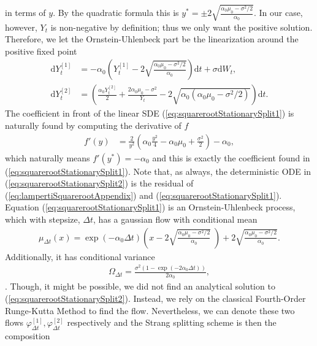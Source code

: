 in terms of $y$. By the quadratic formula this is $y^* = \pm 2\sqrt{\frac{\alpha_0\mu_0 - \sigma^2 / 2}{\alpha_0}}$. In our case, however, $Y_t$ is non-negative by definition; thus we only want the positive solution. Therefore, we let the Ornstein-Uhlenbeck part be the linearization around the positive fixed point
\begin{align}
    \mathrm{d}Y_t^{[1]} &= -\alpha_0 \left(Y_t^{[1]} - 2\sqrt{\frac{\alpha_0\mu_0 - \sigma^2 / 2}{\alpha_0}}\right)\mathrm{d}t + \sigma \mathrm{d}W_t , \label{eq:squarerootStationarySplit1} \\
    \mathrm{d}Y_t^{[2]} &= \left(\frac{\alpha_0 Y_t^{[2]}}{2} + \frac{2\alpha_0 \mu_0 - \sigma^2}{Y_t} - 2\sqrt{\alpha_0\left(\alpha_0\mu_0 - \sigma^2 / 2\right)}\right)\mathrm{d}t. \label{eq:squarerootStationarySplit2}
\end{align}
The coefficient in front of the linear SDE (\ref{eq:squarerootStationarySplit1}) is naturally found by computing the derivative of $f$
\begin{align}
    f'(y) &= \frac{2}{y^2}\left(\alpha_0\frac{y^2}{4}-\alpha_0\mu_0+\frac{\sigma^2}{2}\right) - \alpha_0,
\end{align}
which naturally means $f'(y^*) = - \alpha_0$ and this is exactly the coefficient found in (\ref{eq:squarerootStationarySplit1}). Note that, as always, the deterministic ODE in (\ref{eq:squarerootStationarySplit2}) is the residual of (\ref{eq:lampertiSquarerootAppendix}) and (\ref{eq:squarerootStationarySplit1}).
Equation (\ref{eq:squarerootStationarySplit1}) is an Ornstein-Uhlenbeck process, which with stepsize, $\Delta t$, has a gaussian flow with conditional mean 
\begin{align}
    \mu_{\Delta t}(x) = \exp\left(-\alpha_0 \Delta t\right) \left(x - 2\sqrt{\frac{\alpha_0\mu_0 - \sigma^2 / 2}{\alpha_0}}\;\right) + 2\sqrt{\frac{\alpha_0\mu_0 - \sigma^2 / 2}{\alpha_0}}.
\end{align}
Additionally, it has conditional variance
\begin{align}
     \Omega_{\Delta t} = \frac{\sigma^2\left(1 - \exp\left(-2\alpha_0 \Delta t\right)\right)}{2\alpha_0},
\end{align}
\cite[(5), (6)]{SplittingSchemes}. Though, it might be possible, we did not find an analytical solution to (\ref{eq:squarerootStationarySplit2}). Instead, we rely on the classical Fourth-Order Runge-Kutta Method \cite[p. 541]{numericalAnalysis} to find the flow. Nevertheless, we can denote these two flows $\varphi_{\Delta t}^{[1]}, \varphi_{\Delta t}^{[2]}$ respectively and the Strang splitting scheme is then the composition
